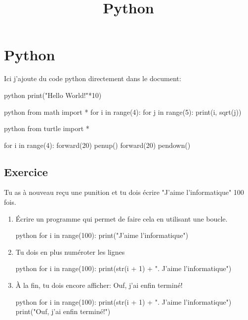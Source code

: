 \documentclass[a4paper,11pt]{article}
\begin{document}
\title{Python}
\date{}
\maketitle


\section{Python}
Ici j'ajoute du code python directement dans le document:\par

\begin{code}{python}
print("Hello World!"*10)
\end{code}


\begin{code}[interactive]{python}
from math import *
for i in range(4):
    for j in range(5):
        print(i, sqrt(j))
\end{code}

\begin{code}{python}
from turtle import *

for i in range(4):
    forward(20)
    penup()
    forward(20)
    pendown()
\end{code}


\subsection{Exercice}
Tu as à nouveau reçu une punition et tu dois écrire "J'aime l'informatique" 100 fois.
\begin{enumerate}
\item Écrire un programme qui permet de faire cela en utilisant une boucle.
\begin{solution}
\begin{code}[interactive]{python}
for i in range(100):
    print("J'aime l'informatique")
\end{code}
\end{solution}
\item Tu dois en plus numéroter les lignes
\begin{solution}
\begin{code}[interactive]{python}
for i in range(100):
    print(str(i + 1) + ". J'aime l'informatique")
\end{code}
\end{solution}
\item À la fin, tu dois encore afficher: Ouf, j'ai enfin terminé!
\begin{solution}
\begin{code}[interactive]{python}
for i in range(100):
    print(str(i + 1) + ". J'aime l'informatique")
print("Ouf, j'ai enfin terminé!")
\end{code}
\end{solution}
\end{enumerate}
\end{document}
